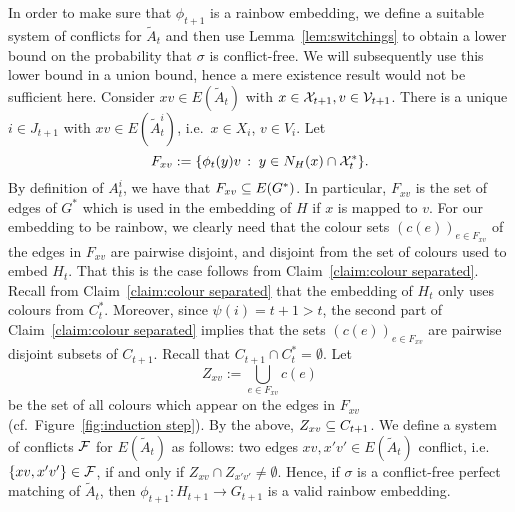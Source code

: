 \documentclass[10pt]{amsart}
\theoremstyle{definition}
\theoremstyle{claimstyle}
\theoremstyle{stepstyle}
\numberwithin{equation}{section}
\begin{document}
In order to make sure that $\phi_{t+1}$ is a rainbow embedding, we define a suitable system of conflicts for $\tilde{A}_t$ and then use Lemma~\ref{lem:switchings} to obtain a lower bound on the probability that $\sigma$ is conflict-free. We will subsequently use this lower bound in a union bound, hence a mere existence result would not be sufficient here.
Consider $xv\in E(\tilde{A}_t)$ with $x\in \mathcal{X}_{t+1},v\in \mathcal{V}_{t+1}$. There is a unique $i\in J_{t+1}$ with $xv\in E(\tilde{A}_{t}^i)$, i.e.~$x\in X_i$, $v\in V_i$. Let $$F_{xv}:=\{\phi_t(y)v\,:\;y\in N_{H}(x)\cap \mathcal{X}_t^\ast\}.$$ %
By definition of $A_{t}^i$, we have that $F_{xv}\subseteq E(G^\ast)$.
In particular, $F_{xv}$ is the set of edges of $G^\ast$ which is used in the embedding of $H$ if $x$ is mapped to $v$.
For our embedding to be rainbow, we clearly need that the colour sets $(c(e))_{e\in F_{xv}}$ of the edges in $F_{xv}$ are pairwise disjoint, and disjoint from the set of colours used to embed $H_t$.
That this is the case follows from Claim~\ref*{claim:colour separated}. Recall from Claim~\ref*{claim:colour separated} that the embedding of $H_t$ only uses colours from $C_t^\ast$. Moreover, since $\psi(i)=t+1>t$, the second part of Claim~\ref*{claim:colour separated} implies that the sets $(c(e))_{e\in F_{xv}}$ are pairwise disjoint subsets of $C_{t+1}$. Recall that $C_{t+1}\cap C_t^\ast=\emptyset$.
Let $$Z_{xv}:=\bigcup_{e\in F_{xv}} c(e)$$ be the set of all colours which appear on the edges in $F_{xv}$ (cf.~Figure~\ref{fig:induction step}). By the above, $Z_{xv}\subseteq C_{t+1}$.
We define a system of conflicts $\mathcal{F}$ for $E(\tilde{A}_t)$ as follows: two edges $xv,x'v'\in E(\tilde{A}_t)$ conflict, i.e.~$\{xv,x'v'\}\in \mathcal{F}$, if and only if $Z_{xv}\cap Z_{x'v'}\neq \emptyset$.
Hence, if $\sigma$ is a conflict-free perfect matching of $\tilde{A}_t$, then $\phi_{t+1}\colon H_{t+1}\to G_{t+1}$ is a valid rainbow embedding.
\end{document}
